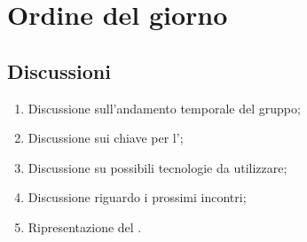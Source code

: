 \section{Ordine del giorno} 
\label{sec:agenda}
\subsection{Discussioni} 
\label{subsec:discussione}
\begin{enumerate}
    \item Discussione sull'andamento temporale del gruppo;
    \item Discussione sui  chiave per l';
    \item Discussione su possibili tecnologie da utilizzare;
    \item Discussione riguardo i prossimi incontri;
    \item Ripresentazione del .
\end{enumerate}
